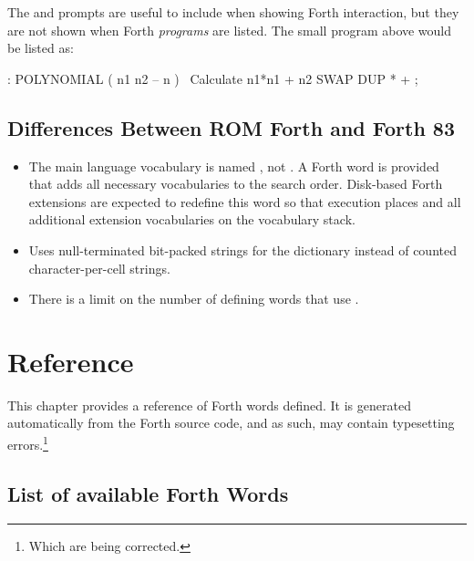 The  and  prompts are useful to include when
showing Forth interaction, but they are not shown when Forth {\em programs\/}
are listed. The small program above would be listed as:

\begin{forthcode}
: POLYNOMIAL ( n1 n2 -- n ) \ Calculate n1*n1 + n2
  SWAP DUP * + ;
\end{forthcode}

\section{Differences Between ROM Forth and Forth 83}

\begin{itemize}
  \item The main language vocabulary is named , not
    . A Forth word  is provided that adds all
    necessary vocabularies to the search order. Disk-based Forth
    extensions are expected to redefine this word so that execution
    places  and all additional extension vocabularies on
    the vocabulary stack.
  \item Uses null-terminated bit-packed strings for the dictionary
    instead of counted character-per-cell strings.
  \item There is a limit on the number of defining words that use
    .
\end{itemize}

\chapter{Reference}


This chapter provides a reference of Forth words defined. It is
generated automatically from the Forth source code, and as such, may
contain typesetting errors.\footnote{Which are being corrected.}

\section{List of available Forth Words}


